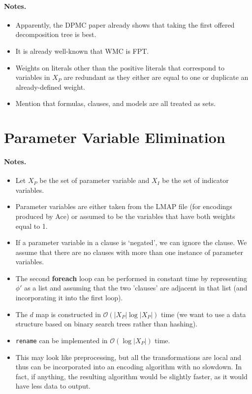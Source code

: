 \documentclass{article}
\theoremstyle{definition}
\theoremstyle{remark}
\begin{document}
\paragraph{Notes.}
\begin{itemize}
\item Apparently, the \textsc{DPMC} paper already shows that taking the first
  offered decomposition tree is best.
\item It is already well-known that WMC is FPT.
\item Weights on literals other than the positive literals that correspond to
  variables in $X_P$ are redundant as they either are equal to one or duplicate
  an already-defined weight.
\item Mention that formulas, clauses, and models are all treated as sets.
\end{itemize}

\section{Parameter Variable Elimination}

\paragraph{Notes.}
\begin{itemize}
\item Let $X_P$ be the set of parameter variable and $X_I$ be the set of
  indicator variables.
\item Parameter variables are either taken from the LMAP file (for encodings
  produced by Ace) or assumed to be the variables that have both weights equal
  to 1.
\item If a parameter variable in a clause is `negated', we can ignore the
  clause. We assume that there are no clauses with more than one instance of
  parameter variables.
\item The second \textbf{foreach} loop can be performed in constant time by
  representing $\phi'$ as a list and assuming that the two 'clauses' are
  adjacent in that list (and incorporating it into the first loop).
\item The $d$ map is constructed in $\mathcal{O}(|X_P|\log|X_P|)$ time (we want
  to use a data structure based on binary search trees rather than hashing).
\item \texttt{rename} can be implemented in $\mathcal{O}(\log |X_P|)$ time.
\item This may look like preprocessing, but all the transformations are local
  and thus can be incorporated into an encoding algorithm with no slowdown. In
  fact, if anything, the resulting algorithm would be slightly faster, as it
  would have less data to output.
\end{itemize}
\end{document}
